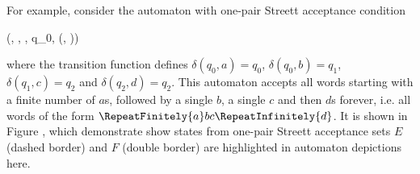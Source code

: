 
    For example, consider the automaton with one-pair Streett acceptance condition

    \startformula
        (, , \delta, q_0, (, )) \EndComma
    \stopformula

    where the transition function defines $\delta(q_0, a) = q_0$, $\delta(q_0, b) = q_1$, $\delta(q_1, c) = q_2$ and $\delta(q_2, d) = q_2$.
    This automaton accepts all words starting with a finite number of $a$s, followed by a single $b$, a single $c$ and then $d$s forever, i.e. all words of the form $\RepeatFinitely{a} b c \RepeatInfinitely{d}$.
    It is shown in Figure , which demonstrate show states from one-pair Streett acceptance sets $E$ (dashed border) and $F$ (double border) are highlighted in automaton depictions here.

\stopsubsection

